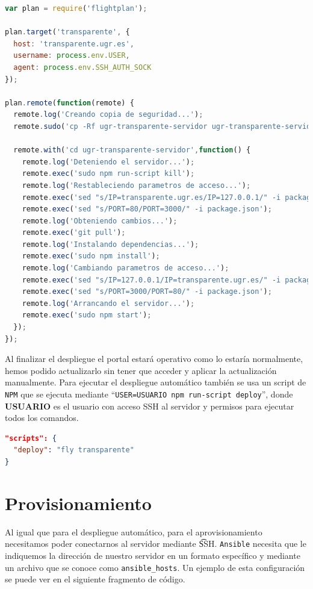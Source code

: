 \begin{lstlisting}[language=javascript,caption={Archivo flightplan.js},label={lst:testjs}]
var plan = require('flightplan');

plan.target('transparente', {
  host: 'transparente.ugr.es',
  username: process.env.USER,
  agent: process.env.SSH_AUTH_SOCK
});

plan.remote(function(remote) {
  remote.log('Creando copia de seguridad...');
  remote.sudo('cp -Rf ugr-transparente-servidor ugr-transparente-servidor.bak', {user: process.env.USER});

  remote.with('cd ugr-transparente-servidor',function() {
    remote.log('Deteniendo el servidor...');
    remote.exec('sudo npm run-script kill');
    remote.log('Restableciendo parametros de acceso...');
    remote.exec('sed "s/IP=transparente.ugr.es/IP=127.0.0.1/" -i package.json');
    remote.exec('sed "s/PORT=80/PORT=3000/" -i package.json');
    remote.log('Obteniendo cambios...');
    remote.exec('git pull');
    remote.log('Instalando dependencias...');
    remote.exec('sudo npm install');
    remote.log('Cambiando parametros de acceso...');
    remote.exec('sed "s/IP=127.0.0.1/IP=transparente.ugr.es/" -i package.json');
    remote.exec('sed "s/PORT=3000/PORT=80/" -i package.json');
    remote.log('Arrancando el servidor...');
    remote.exec('sudo npm start');
  });
});
\end{lstlisting}

Al finalizar el despliegue el portal estará operativo como lo estaría normalmente, hemos podido actualizarlo sin tener que acceder y aplicar la actualización manualmente. Para ejecutar el despliegue automático también se usa un script de {\tt NPM} que se ejecuta mediante ``{\tt USER=USUARIO npm run-script deploy}'', donde \textbf{USUARIO} es el usuario con acceso SSH al servidor y permisos para ejecutar todos los comandos.

\begin{lstlisting}[language=json,caption={Scripts de despliegue automático},label={lst:deploy}]
"scripts": {
  "deploy": "fly transparente"
}
\end{lstlisting}

\section{Provisionamiento}

Al igual que para el despliegue automático, para el aprovisionamiento necesitamos poder conectarnos al servidor mediante {\t SSH}. {\tt Ansible} necesita que le indiquemos la dirección de nuestro servidor en un formato específico y mediante un archivo que se conoce como {\tt ansible\_hosts}. Un ejemplo de esta configuración se puede ver en el siguiente fragmento de código.

